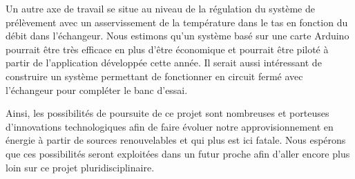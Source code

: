 \documentclass[a4paper,11pt,french]{article}
\begin{document}
Un autre axe de travail se situe au niveau de la régulation du système de prélèvement avec un asservissement de la température dans le tas en fonction du débit dans l'échangeur. Nous estimons qu'un système basé sur une carte Arduino\texttrademark{} pourrait être très efficace en plus d'être économique et pourrait être piloté à partir de l'application développée cette année.
Il serait aussi intéressant de construire un système permettant de fonctionner en circuit fermé avec l'échangeur pour compléter le banc d'essai.

Ainsi, les possibilités de poursuite de ce projet sont nombreuses et porteuses d'innovations technologiques afin de faire évoluer notre approvisionnement en énergie à partir de sources renouvelables et qui plus est ici fatale. Nous espérons que ces possibilités seront exploitées dans un futur proche afin d'aller encore plus loin sur ce projet pluridisciplinaire. 

\clearpage

\appendix



\clearpage


\end{document}
